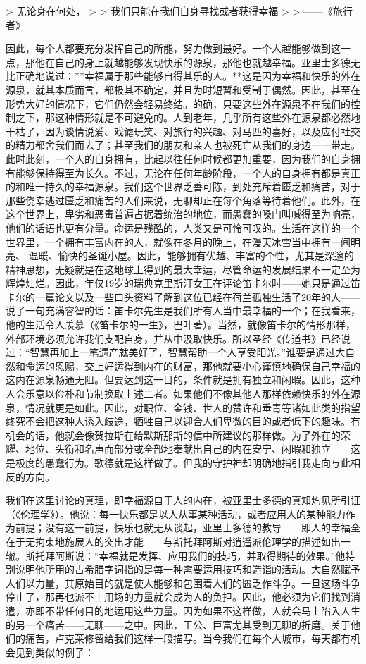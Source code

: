 \documentclass[12pt,oneside]{book}
\begin{document}
 

> 无论身在何处， 
>
> 我们只能在我们自身寻找或者获得幸福 
>
> ——《旅行者》 

 

因此，每个人都要充分发挥自己的所能，努力做到最好。一个人越能够做到这一点，那他在自己的身上就越能够发现快乐的源泉，那他也就越幸福。亚里士多德无比正确地说过：**幸福属于那些能够自得其乐的人。**这是因为幸福和快乐的外在源泉，就其本质而言，都极其不确定，并且为时短暂和受制于偶然。因此，甚至在形势大好的情况下，它们仍然会轻易终结。的确，只要这些外在源泉不在我们的控制之下，那这种情形就是不可避免的。人到老年，几乎所有这些外在源泉都必然地干枯了，因为谈情说爱、戏谑玩笑、对旅行的兴趣、对马匹的喜好，以及应付社交的精力都舍我们而去了；甚至我们的朋友和亲人也被死亡从我们的身边一一带走。此时此刻，一个人的自身拥有，比起以往任何时候都更加重要，因为我们的自身拥有能够保持得至为长久。不过，无论在任何年龄阶段，一个人的自身拥有都是真正的和唯一持久的幸福源泉。我们这个世界乏善可陈，到处充斥着匮乏和痛苦，对于那些侥幸逃过匮乏和痛苦的人们来说，无聊却正在每个角落等待着他们。此外，在这个世界上，卑劣和恶毒普遍占据着统治的地位，而愚蠢的嗓门叫喊得至为响亮，他们的话语也更有分量。命运是残酷的，人类又是可怜可叹的。生活在这样的一个世界里，一个拥有丰富内在的人，就像在冬月的晚上，在漫天冰雪当中拥有一间明亮、
温暖、愉快的圣诞小屋。因此，能够拥有优越、丰富的个性，尤其是深邃的精神思想，无疑就是在这地球上得到的最大幸运，尽管命运的发展结果不一定至为辉煌灿烂。因此，年仅19岁的瑞典克里斯汀女王在评论笛卡尔时——她只是通过笛卡尔的一篇论文以及一些口头资料了解到这位已经在荷兰孤独生活了20年的人——说了一句充满睿智的话：笛卡尔先生是我们所有人当中最幸福的一个；在我看来，他的生活令人羡慕（《笛卡尔的一生》，巴叶著）。当然，就像笛卡尔的情形那样，外部环境必须允许我们支配自身，并从中汲取快乐。所以圣经《传道书》已经说过：“智慧再加上一笔遗产就美好了，智慧帮助一个人享受阳光。”谁要是通过大自然和命运的恩赐，交上好运得到内在的财富，那他就要小心谨慎地确保自己幸福的这内在源泉畅通无阻。但要达到这一目的，条件就是拥有独立和闲暇。因此，这种人会乐意以俭朴和节制换取上述二者。如果他们不像其他人那样依赖快乐的外在源泉，情况就更是如此。因此，对职位、金钱、世人的赞许和垂青等诸如此类的指望终究不会把这种人诱入歧途，牺牲自己以迎合人们卑微的目的或者低下的趣味。有机会的话，他就会像贺拉斯在给默斯那斯的信中所建议的那样做。为了外在的荣耀、地位、头衔和名声而部分或全部地奉献出自己的内在安宁、闲暇和独立——这是极度的愚蠢行为。歌德就是这样做了。但我的守护神却明确地指引我走向与此相反的方向。 

我们在这里讨论的真理，即幸福源自于人的内在，被亚里士多德的真知灼见所引证（《伦理学》）。他说：每一快乐都是以人从事某种活动，或者应用人的某种能力作为前提；没有这一前提，快乐也就无从谈起，亚里士多德的教导——即人的幸福全在于无拘束地施展人的突出才能——与斯托拜阿斯对逍遥派伦理学的描述如出一辙。斯托拜阿斯说：“幸福就是发挥、应用我们的技巧，并取得期待的效果。”他特别说明他所用的古希腊字词指的是每一种需要运用技巧和造诣的活动。大自然赋予人们以力量，其原始目的就是使人能够和包围着人们的匮乏作斗争。一旦这场斗争停止了，那再也派不上用场的力量就会成为人的负担。因此，他必须为它们找到消遣，亦即不带任何目的地运用这些力量。因为如果不这样做，人就会马上陷入人生的另一个痛苦——无聊——之中。因此，王公、巨富尤其受到无聊的折磨。关于他们的痛苦，卢克莱修留给我们这样一段描写。当今我们在每个大城市，每天都有机会见到类似的例子： 
\end{document}
